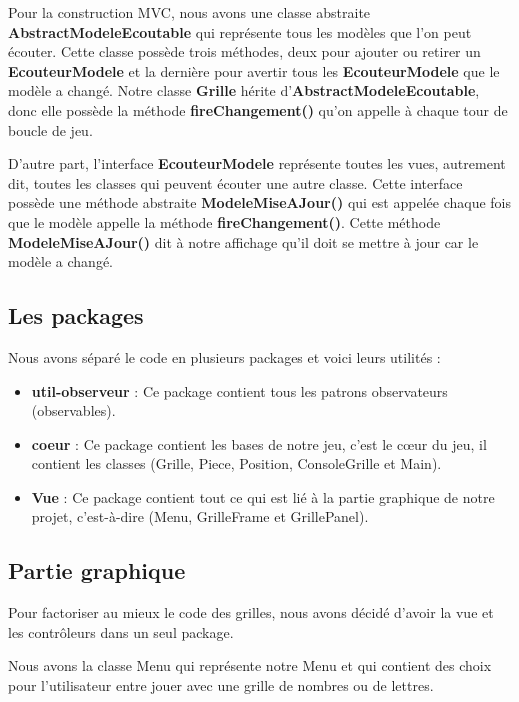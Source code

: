 \documentclass[a4paper,10pt]{article}
\begin{document}
Pour la construction MVC, nous avons une classe abstraite \textbf{AbstractModeleEcoutable} qui représente tous les modèles que l'on peut écouter. Cette classe possède trois méthodes, deux pour ajouter ou retirer un \textbf{EcouteurModele} et la dernière pour avertir tous les \textbf{EcouteurModele} que le modèle a changé. Notre classe \textbf{Grille} hérite d'\textbf{AbstractModeleEcoutable}, donc elle possède la méthode \textbf{fireChangement()} qu'on appelle à chaque tour de boucle de jeu.

D'autre part, l'interface \textbf{EcouteurModele} représente toutes les vues, autrement dit, toutes les classes qui peuvent écouter une autre classe. Cette interface possède une méthode abstraite \textbf{ModeleMiseAJour()} qui est appelée chaque fois que le modèle appelle la méthode \textbf{fireChangement()}. Cette méthode \textbf{ModeleMiseAJour()} dit à notre affichage qu'il doit se mettre à jour car le modèle a changé.

\subsection{Les packages}
Nous avons séparé le code en plusieurs packages et voici leurs utilités :

\begin{itemize}
\item \textbf{util-observeur} : Ce package contient tous les patrons observateurs (observables).

\item \textbf{coeur} : Ce package contient les bases de notre jeu, c'est le cœur du jeu, il contient les classes (Grille, Piece, Position, ConsoleGrille et Main).

\item \textbf{Vue} : Ce package contient tout ce qui est lié à la partie graphique de notre projet, c'est-à-dire (Menu, GrilleFrame et GrillePanel).
\end{itemize}

\subsection{Partie graphique}

Pour factoriser au mieux le code des grilles, nous avons décidé d'avoir la vue et les contrôleurs dans un seul package.

Nous avons la classe Menu qui représente notre Menu et qui contient des choix pour l'utilisateur entre jouer avec une grille de nombres ou de lettres.
\end{document}
